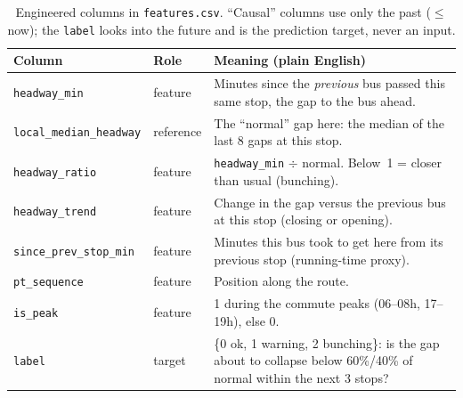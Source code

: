 \documentclass[11pt,a4paper]{article}
\begin{document}
\begin{table}[H]
\centering
\small
\caption{Engineered columns in \texttt{features.csv}. ``Causal'' columns use only the past
($\le$ now); the \texttt{label} looks into the future and is the prediction target, never an input.}
\label{tab:feat}
\begin{tabular}{P{3.2cm}P{1.5cm}P{8.2cm}}
\toprule
Column & Role & Meaning (plain English) \\
\midrule
\texttt{headway\_min}          & feature & Minutes since the \emph{previous} bus passed this same stop, the gap to the bus ahead. \\
\texttt{local\_median\_headway}& reference & The ``normal'' gap here: the median of the last 8 gaps at this stop. \\
\texttt{headway\_ratio}        & feature & \texttt{headway\_min} $\div$ normal. Below~1 = closer than usual (bunching). \\
\texttt{headway\_trend}        & feature & Change in the gap versus the previous bus at this stop (closing or opening). \\
\texttt{since\_prev\_stop\_min}& feature & Minutes this bus took to get here from its previous stop (running-time proxy). \\
\texttt{pt\_sequence}          & feature & Position along the route. \\
\texttt{is\_peak}              & feature & 1 during the commute peaks (06--08h, 17--19h), else 0. \\
\texttt{label}                 & target  & \{0 ok, 1 warning, 2 bunching\}: is the gap about to collapse below 60\%/40\% of normal within the next 3 stops? \\
\bottomrule
\end{tabular}
\end{table}
\end{document}
